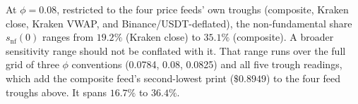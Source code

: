 At $\phi=0.08$, restricted to the four price feeds' own troughs (composite, Kraken close,
Kraken VWAP, and Binance/USDT-deflated), the non-fundamental share $s_{\mathrm{nf}}(0)$ ranges from
$19.2\%$ (Kraken close) to $35.1\%$ (composite).
A broader sensitivity range should not be conflated with it. That range runs over the
full grid of three $\phi$ conventions (0.0784, 0.08, 0.0825) and all five
trough readings, which add the composite feed's second-lowest print
($\$0.8949$) to the four feed troughs above.
It spans $16.7\%$ to $36.4\%$.
